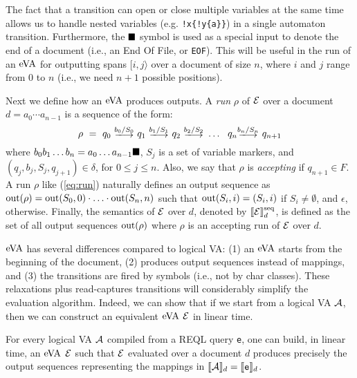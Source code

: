 The fact that a transition can open or close multiple variables at the same time allows us to handle nested variables (e.g. \texttt{!x\{!y\{a\}\}}) in a single automaton transition. Furthermore, the $\blacksquare$ symbol is used as a special input to denote the end of a document (i.e., an End Of File, or \texttt{EOF}). This will be useful in the run of an $\mathrm{eVA}$ for outputting spans $[i,
	j\rangle$ over a document of size $n$, where $i$ and $j$ range from $0$ to $n$ (i.e., we need $n+1$ possible positions).

Next we define how an $\mathrm{eVA}$ produces outputs.
A \emph{run} $\rho$ of $\mathcal{E}$ over a document $d = a_0 \cdots a_{n-1}$ is a sequence of the form:
\begin{equation}\label{eq:run}
	\rho \ = \ q_0 \ \longtrans{b_0 / S_0} \ q_1 \ \longtrans{b_1 / S_1} \ q_2 \ \longtrans{b_2 / S_2} \ \ldots \ \ q_{n} \longtrans{b_{n} / S_n} \ q_{n+1}
\end{equation}
where $b_0 b_1 \ldots b_n = a_0 \ldots a_{n-1} \blacksquare$, $S_j$ is a set of variable markers, and $(q_j,b_{j},S_{j}, q_{j+1}) \in \delta$, for $0\leq j\leq n$. Also, we say that $\rho$ is
\emph{accepting} if $q_{n+1} \in F$. A run $\rho$ like (\ref{eq:run}) naturally defines an output sequence as $\operatorname{out}(\rho) = \operatorname{out}(S_0, 0) \cdot \ldots \cdot \operatorname{out}(S_n, n)$ such that $\operatorname{out}(S_i, i) = (S_i, i)$ if $S_i \neq \emptyset$, and $\epsilon$, otherwise. Finally, the semantics of $\mathcal{E}$ over
$d$, denoted by $\llbracket\mathcal{E}\rrbracket^{\operatorname{seq}}_d$, is defined as the set of all output sequences $\operatorname{out}(\rho)$ where $\rho$ is an accepting run of $\mathcal{E}$ over
$d$.

$\mathrm{eVA}$ has several differences compared to logical VA: (1) an $\mathrm{eVA}$ starts from the beginning of the document, (2) produces output sequences instead of mappings, and (3) the transitions are fired by symbols (i.e., not by char classes). These relaxations plus read-captures transitions will considerably simplify the evaluation algorithm.  Indeed, we can show that if we start from a logical VA $\mathcal{A}$, then we can construct an equivalent $\mathrm{eVA}$ $\mathcal{E}$ in linear time. %
\begin{proposition}\label{prop:eVAconstruction}
	For every logical VA $\mathcal{A}$ compiled from a REQL query \texttt{e}, one can build, in linear time, an $\mathrm{eVA}$ $\mathcal{E}$ such that $\mathcal{E}$ evaluated over a document $d$ produces precisely the output sequences representing the mappings in $\llbracket\mathcal{A}\rrbracket_d = \llbracket\texttt{e}\rrbracket_d$.
\end{proposition}

